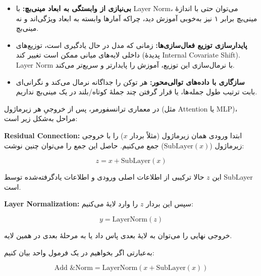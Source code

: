 \begin{itemize}
	\item \textbf{بی‌نیازی از وابستگی به ابعاد مینی‌بچ:}  
	با Layer Norm، می‌توان حتی با اندازهٔ مینی‌بچ برابر ۱ نیز به‌خوبی آموزش دید، چراکه آمارها وابسته به ابعاد ویژگی‌اند و نه مینی‌بچ.
	
	\item \textbf{پایدارسازی توزیع فعال‌سازی‌ها:}  
	زمانی که مدل در حال یادگیری است، توزیع‌های داخلی لایه‌های میانی ممکن است تغییر کند (پدیدهٔ Internal Covariate Shift). Layer Norm با نرمال‌سازی این توزیع، آموزش را پایدارتر و سریع‌تر می‌کند.
	
	\item \textbf{سازگاری با داده‌های توالی‌محور:}  
	هر توکن را جداگانه نرمال می‌کند و نگرانی‌ای بابت ترتیب طول جمله‌ها، یا قرار گرفتن چند جملهٔ کوتاه/بلند در یک مینی‌بچ نداریم.
\end{itemize}





در معماری ترانسفورمر، پس از خروجیِ هر زیرماژول (مثل Attention یا MLP)، مراحل به‌شکل زیر است:

\textbf{Residual Connection:} ابتدا ورودی همان زیرماژول (مثلاً بردار \( x \)) را با خروجی زیرماژول (\( \text{SubLayer}(x) \)) جمع می‌کنیم. حاصل این جمع را می‌توان چنین نوشت:

\[
z = x + \text{SubLayer}(x)
\]

این \( z \) حالا ترکیبی از اطلاعات اصلی ورودی و اطلاعات یادگرفته‌شده توسط SubLayer است.

\textbf{Layer Normalization:} سپس این بردار \( z \) را وارد لایهٔ  می‌کنیم:

\[
y = \text{LayerNorm}(z)
\]

خروجی نهایی را می‌توان به لایهٔ بعدی پاس داد یا به مرحلهٔ بعدی در همین لایه.

به‌عبارتی اگر بخواهیم در یک فرمول واحد بیان کنیم:

\[
\text{Add \& Norm} = \text{LayerNorm}\left(x + \text{SubLayer}(x)\right)
\]











